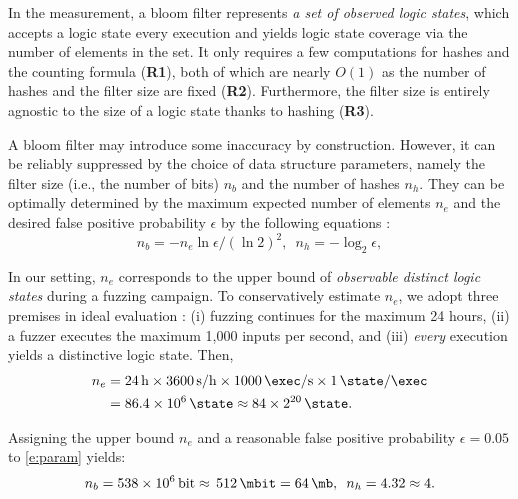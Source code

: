 \documentclass[letterpaper,twocolumn,10pt]{article}
\begin{document}
%
%
In the measurement, a bloom filter represents \emph{a set of observed logic
states}, which accepts a logic state every execution and yields logic state
coverage via the number of elements in the set. It only requires a few
computations for hashes and the counting formula (\textbf{R1}), both of which
are nearly $O(1)$ as the number of hashes and the filter size are fixed
(\textbf{R2}). Furthermore, the filter size is entirely agnostic to the size of
a logic state thanks to hashing (\textbf{R3}). 

%
A bloom filter may introduce some inaccuracy by construction. However, it can
be reliably suppressed by the choice of data structure parameters, namely the
filter size (i.e., the number of bits) $n_b$ and the number of hashes $n_h$.
They can be optimally determined by the maximum expected number of elements
$n_e$ and the desired false positive probability $\epsilon$ by the following
equations \cite{tarkoma2012bloom}:
%
\begin{equation}
  n_b = -n_e\ln{\epsilon}/(\ln{2})^2, \enspace n_h = -\log_2{\epsilon},
  \label{e:param}
\end{equation}

In our setting, $n_e$ corresponds to the upper bound of \emph{observable
distinct logic states} during a fuzzing campaign. To conservatively estimate
$n_e$, we adopt three premises in ideal evaluation : (i) fuzzing continues for
the maximum 24 hours, (ii) a fuzzer executes the maximum 1,000 inputs per
second, and (iii) \emph{every} execution yields a distinctive logic state. Then, 
%
\begin{align}
  n_e &= \SI{24}{\hour} \times \SI[per-mode=symbol]{3600}{\second\per\hour}
         \times \SI[per-mode=symbol]{1000}{\exec\per\second} 
         \times \SI[per-mode=symbol]{1}{\state\per\exec} \nonumber \\
      &= \SI{86.4e+6}{\state} 
         \approx \SI[parse-numbers=false]{84 \times 2^{20}}{\state}. \nonumber
\end{align}

Assigning the upper bound $n_e$ and a reasonable false positive probability
$\epsilon=0.05$ to \autoref{e:param} yields:
%
\begin{equation}
  n_b = \SI{538e+6}{\bit}\approx\,\SI{512}{\mbit}=\SI{64}{\mb}, \enspace n_h = 4.32 \approx 4. \nonumber
\end{equation}
\end{document}
